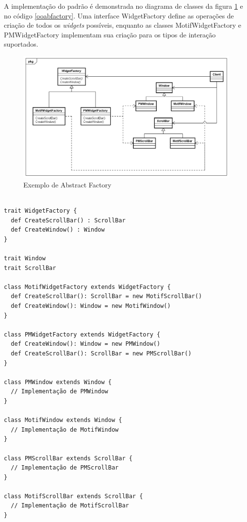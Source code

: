 A implementação do padrão é demonstrada no 
diagrama de classes da figura \ref{abfactory_exemplo} 
e no código \ref{ooabfactory}. Uma interface 
WidgetFactory define as operações de criação 
de todos os \textit{widgets} possíveis, enquanto 
as classes MotifWidgetFactory e PMWidgetFactory 
implementam sua criação para os tipos de 
interação suportados.

\begin{figure}[htb]
	\caption{\label{abfactory_exemplo}Exemplo de Abstract Factory}
	\begin{center}
	    \includegraphics[scale=0.5]{5_padroes-contexto-funcional/5.1_criacionais/5.1.2_abstract-factory/abstractfactory_exemplo.png}
	\end{center}
\end{figure}

\begin{lstlisting}[caption={Abstract Factory Orientado a Objetos},label=ooabfactory]
	
trait WidgetFactory {
  def CreateScrollBar() : ScrollBar
  def CreateWindow() : Window
}

trait Window 
trait ScrollBar

class MotifWidgetFactory extends WidgetFactory {
  def CreateScrollBar(): ScrollBar = new MotifScrollBar()
  def CreateWindow(): Window = new MotifWindow()
}

class PMWidgetFactory extends WidgetFactory {
  def CreateWindow(): Window = new PMWindow()
  def CreateScrollBar(): ScrollBar = new PMScrollBar()
}

class PMWindow extends Window {
  // Implementação de PMWindow
}

class MotifWindow extends Window {
  // Implementação de MotifWindow
}

class PMScrollBar extends ScrollBar {
  // Implementação de PMScrollBar
}

class MotifScrollBar extends ScrollBar {
  // Implementação de MotifScrollBar
}

\end{lstlisting}



